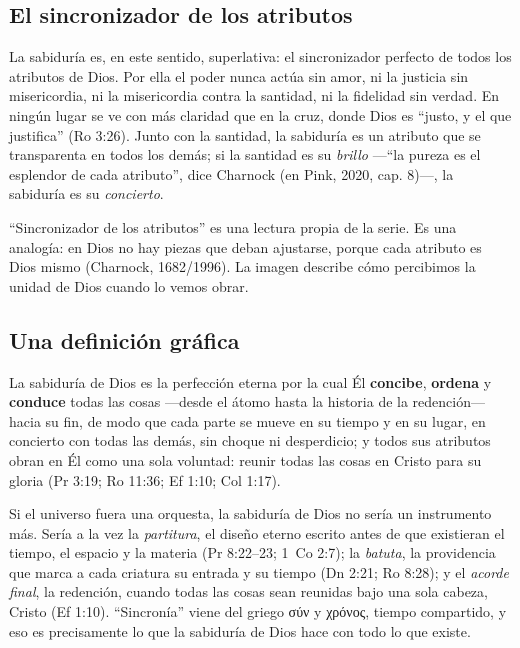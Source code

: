 \documentclass[11pt,letterpaper]{article}
\newcommand{\grc}[1]{\foreignlanguage{ancientgreek}{#1}}
\newcommand{\destacar}[1]{\textbf{\textcolor{azul}{#1}}}
\begin{document}
\subsection{El sincronizador de los atributos}

La sabiduría es, en este sentido, superlativa: el sincronizador perfecto de todos los atributos de Dios. Por ella el poder nunca actúa sin amor, ni la justicia sin misericordia, ni la misericordia contra la santidad, ni la fidelidad sin verdad. En ningún lugar se ve con más claridad que en la cruz, donde Dios es ``justo, y el que justifica'' (Ro 3:26). Junto con la santidad, la sabiduría es un atributo que se transparenta en todos los demás; si la santidad es su \emph{brillo} ---``la pureza es el esplendor de cada atributo'', dice Charnock (en Pink, 2020, cap. 8)---, la sabiduría es su \emph{concierto}.

\begin{nota}[Precisión]
``Sincronizador de los atributos'' es una lectura propia de la serie. Es una analogía: en Dios no hay piezas que deban ajustarse, porque cada atributo es Dios mismo (Charnock, 1682/1996). La imagen describe cómo percibimos la unidad de Dios cuando lo vemos obrar.
\end{nota}

\subsection{Una definición gráfica}

\begin{tcolorbox}[colback=papiro,colframe=azul,boxrule=1pt,arc=3pt]
La sabiduría de Dios es la perfección eterna por la cual Él \destacar{concibe}, \destacar{ordena} y \destacar{conduce} todas las cosas ---desde el átomo hasta la historia de la redención--- hacia su fin, de modo que cada parte se mueve en su tiempo y en su lugar, en concierto con todas las demás, sin choque ni desperdicio; y todos sus atributos obran en Él como una sola voluntad: reunir todas las cosas en Cristo para su gloria (Pr 3:19; Ro 11:36; Ef 1:10; Col 1:17).
\end{tcolorbox}

Si el universo fuera una orquesta, la sabiduría de Dios no sería un instrumento más. Sería a la vez la \emph{partitura}, el diseño eterno escrito antes de que existieran el tiempo, el espacio y la materia (Pr 8:22--23; 1~Co 2:7); la \emph{batuta}, la providencia que marca a cada criatura su entrada y su tiempo (Dn 2:21; Ro 8:28); y el \emph{acorde final}, la redención, cuando todas las cosas sean reunidas bajo una sola cabeza, Cristo (Ef 1:10). ``Sincronía'' viene del griego \grc{σύν} y \grc{χρόνος}, tiempo compartido, y eso es precisamente lo que la sabiduría de Dios hace con todo lo que existe.
\end{document}
